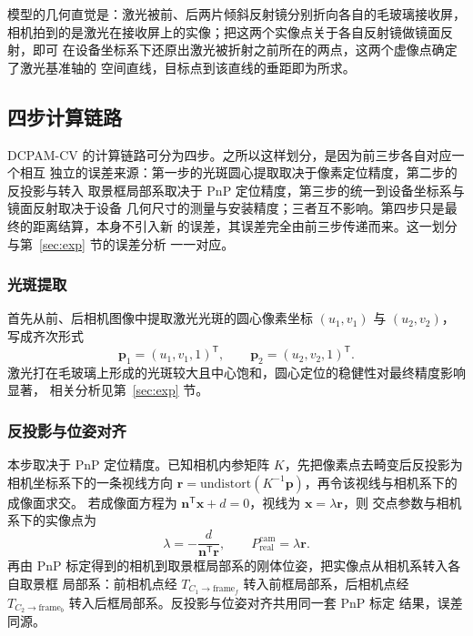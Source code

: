 模型的几何直觉是：激光被前、后两片倾斜反射镜分别折向各自的毛玻璃接收屏，
相机拍到的是激光在接收屏上的实像；把这两个实像点关于各自反射镜做镜面反射，即可
在设备坐标系下还原出激光被折射之前所在的两点，这两个虚像点确定了激光基准轴的
空间直线，目标点到该直线的垂距即为所求。

\subsection{四步计算链路}

DCPAM-CV 的计算链路可分为四步。之所以这样划分，是因为前三步各自对应一个相互
独立的误差来源：第一步的光斑圆心提取取决于像素定位精度，第二步的反投影与转入
取景框局部系取决于 PnP 定位精度，第三步的统一到设备坐标系与镜面反射取决于设备
几何尺寸的测量与安装精度；三者互不影响。第四步只是最终的距离结算，本身不引入新
的误差，其误差完全由前三步传递而来。这一划分与第~\ref{sec:exp} 节的误差分析
一一对应。

\subsubsection{光斑提取}
首先从前、后相机图像中提取激光光斑的圆心像素坐标 $(u_1,v_1)$ 与 $(u_2,v_2)$，
写成齐次形式
\begin{equation}
\label{eq:pixel}
\bm{p}_1 = (u_1, v_1, 1)^\mathsf{T}, \qquad
\bm{p}_2 = (u_2, v_2, 1)^\mathsf{T}.
\end{equation}
激光打在毛玻璃上形成的光斑较大且中心饱和，圆心定位的稳健性对最终精度影响显著，
相关分析见第~\ref{sec:exp} 节。

\subsubsection{反投影与位姿对齐}
本步取决于 PnP 定位精度。已知相机内参矩阵
$K$，先把像素点去畸变后反投影为相机坐标系下的一条视线方向
$\bm{r}=\mathrm{undistort}(K^{-1}\bm{p})$，再令该视线与相机系下的成像面求交。
若成像面方程为 $\bm{n}^\mathsf{T}\bm{x}+d=0$，视线为 $\bm{x}=\lambda\bm{r}$，则
交点参数与相机系下的实像点为
\begin{equation}
\label{eq:intersect}
\lambda = -\frac{d}{\bm{n}^\mathsf{T}\bm{r}}, \qquad
P_{\mathrm{real}}^{\text{cam}} = \lambda\bm{r}.
\end{equation}
再由 PnP 标定得到的相机到取景框局部系的刚体位姿，把实像点从相机系转入各自取景框
局部系：前相机点经 $T_{C_1\to\text{frame}_f}$ 转入前框局部系，后相机点经
$T_{C_2\to\text{frame}_b}$ 转入后框局部系。反投影与位姿对齐共用同一套 PnP 标定
结果，误差同源。

